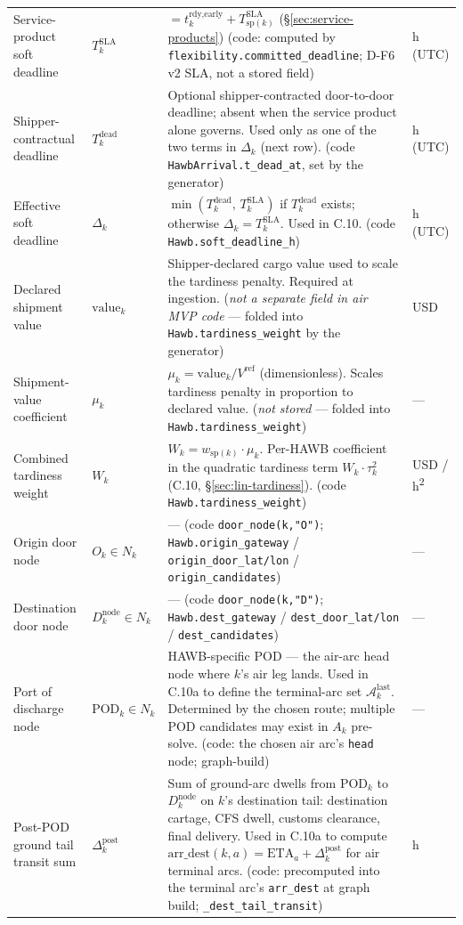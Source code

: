 \documentclass[11pt,a4paper]{article}
\theoremstyle{definition}
\begin{document}
\begin{table}[H]
\begin{tabular}{p{3.5cm}p{2.2cm}p{6.5cm}p{1.5cm}}
Service-product soft deadline & $T_k^{\text{SLA}}$ & $= t_k^{\text{rdy,early}} + T^{\text{SLA}}_{\text{sp}(k)}$ (\S\ref{sec:service-products}) (code: computed by \texttt{flexibility.committed\_deadline}; D-F6 v2 SLA, not a stored field) & h (UTC) \\
Shipper-contractual deadline & $T_k^{\text{dead}}$ & Optional shipper-contracted door-to-door deadline; absent when the service product alone governs. Used only as one of the two terms in $\Delta_k$ (next row). (code \texttt{HawbArrival.t\_dead\_at}, set by the generator) & h (UTC) \\
Effective soft deadline & $\Delta_k$ & $\min(T_k^{\text{dead}},\, T_k^{\text{SLA}})$ if $T_k^{\text{dead}}$ exists; otherwise $\Delta_k = T_k^{\text{SLA}}$. Used in C.10. (code \texttt{Hawb.soft\_deadline\_h}) & h (UTC) \\
Declared shipment value & $\text{value}_k$ & Shipper-declared cargo value used to scale the tardiness penalty. Required at ingestion. (\emph{not a separate field in air MVP code} --- folded into \texttt{Hawb.tardiness\_weight} by the generator) & USD \\
Shipment-value coefficient & $\mu_k$ & $\mu_k = \text{value}_k / V^{\text{ref}}$ (dimensionless). Scales tardiness penalty in proportion to declared value. (\emph{not stored} --- folded into \texttt{Hawb.tardiness\_weight}) & --- \\
Combined tardiness weight & $W_k$ & $W_k = w_{\text{sp}(k)} \cdot \mu_k$. Per-HAWB coefficient in the quadratic tardiness term $W_k \cdot \tau_k^2$ (C.10, \S\ref{sec:lin-tardiness}). (code \texttt{Hawb.tardiness\_weight}) & USD / h\textsuperscript{2} \\
Origin door node & $O_k \in N_k$ & --- (code \texttt{door\_node(k,"O")}; \texttt{Hawb.origin\_gateway} / \texttt{origin\_door\_lat/lon} / \texttt{origin\_candidates}) & --- \\
Destination door node & $D_k^{\text{node}} \in N_k$ & --- (code \texttt{door\_node(k,"D")}; \texttt{Hawb.dest\_gateway} / \texttt{dest\_door\_lat/lon} / \texttt{dest\_candidates}) & --- \\
Port of discharge node & $\text{POD}_k \in N_k$ & HAWB-specific POD --- the air-arc head node where $k$'s air leg lands. Used in C.10a to define the terminal-arc set $\mathcal{A}^{\text{last}}_k$. Determined by the chosen route; multiple POD candidates may exist in $A_k$ pre-solve. (code: the chosen air arc's \texttt{head} node; graph-build) & --- \\
Post-POD ground tail transit sum & $\Delta^{\text{post}}_k$ & Sum of ground-arc dwells from $\text{POD}_k$ to $D_k^{\text{node}}$ on $k$'s destination tail: destination cartage, CFS dwell, customs clearance, final delivery. Used in C.10a to compute $\text{arr\_dest}(k, a) = \text{ETA}_a + \Delta^{\text{post}}_k$ for air terminal arcs. (code: precomputed into the terminal arc's \texttt{arr\_dest} at graph build; \texttt{\_dest\_tail\_transit}) & h \\

\end{tabular}
\end{table}
\end{document}
